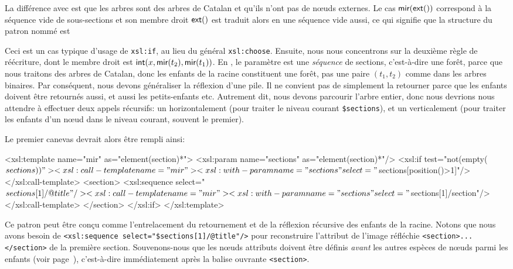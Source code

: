 La différence avec  est que les arbres \XML sont des arbres
de Catalan et qu'ils n'ont pas de nœuds externes. Le cas
\(\textsf{mir}(\textsf{ext}())\) correspond à la séquence vide de
sous-sections et son membre droit \(\textsf{ext}()\) est traduit alors en
une séquence vide aussi, ce qui signifie que la structure du patron
nommé est
Ceci est un cas typique d'usage de \texttt{xsl:if}, au lieu du général
\texttt{xsl:choose}. Ensuite, nous nous concentrons sur la deuxième
règle de réécriture, dont le membre droit est
\(\textsf{int}(x,\textsf{mir}(t_2),\textsf{mir}(t_1))\). En \XSLT, le paramètre
est une \emph{séquence} de sections, c'est-à-dire une forêt, parce que
nous traitons des arbres de Catalan, donc les enfants de la racine
constituent une forêt, pas une paire \((t_1, t_2)\) comme dans les
arbres binaires. Par conséquent, nous devons généraliser la réflexion
d'une pile. Il ne convient pas de simplement la retourner parce que
les enfants doivent être retournés aussi, et aussi les petits-enfants
etc. Autrement dit, nous devons parcourir l'arbre entier, donc nous
devrions nous attendre à effectuer deux appels récursifs: un
horizontalement (pour traiter le niveau courant \texttt{\$sections}),
et un verticalement (pour traiter les enfants d'un nœud dans le
niveau courant, souvent le premier).

Le premier canevas devrait alors être rempli ainsi:
\begin{sverb}
  <xsl:template name="mir" as="element(section)*">
    <xsl:param name="sections" as="element(section)*"/>
    <xsl:if test="not(empty($sections))">
      <xsl:call-template name="mir">
        <xsl:with-param name="sections"
                        select="$sections[position()>1]"/>
      </xsl:call-template>
      <section>
        <xsl:sequence select="$sections[1]/@title"/>
        <xsl:call-template name="mir">
          <xsl:with-param name="sections"
                          select="$sections[1]/section"/>
        </xsl:call-template>
      </section>
    </xsl:if>
  </xsl:template>
\end{sverb}
Ce patron peut être conçu comme l'entrelacement du retournement et de
la réflexion récursive des enfants de la racine. Notons que nous avons
besoin de \texttt{<xsl:sequence select="\$sections[1]/@title"/>} pour
reconstruire l'attribut de l'image réfléchie
\texttt{<section>...</section>} de la première section. Souvenons-nous
que les nœuds attributs doivent être définis \emph{avant} les
autres espèces de nœuds parmi les enfants (voir
page~\pageref{attr_before}), c'est-à-dire immédiatement après la
balise ouvrante \texttt{<section>}.

